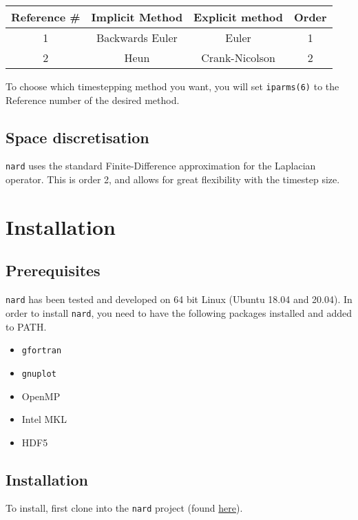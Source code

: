 \documentclass[11pt]{article}
\begin{document}
        {\centering\begin{table}[H]
             \begin{tabular}{c | c | c | c}
             Reference \# & Implicit Method & Explicit method & Order \\
             \hline
             1            & Backwards Euler & Euler           & 1     \\
             2            & Heun            & Crank-Nicolson  & 2
    \end{tabular}\label{tab:table1}
    \end{table}}

    To choose which timestepping method you want, you will set \texttt{iparms(6)} to the Reference number of the desired method.

    \subsection{Space discretisation}
    \texttt{nard} uses the standard Finite-Difference approximation for the Laplacian operator. This is order 2, and allows for great flexibility with the timestep size.

    \section[Installation]{Installation}
    \subsection[Prerequisites]{Prerequisites}
    \texttt{nard} has been tested and developed on 64 bit Linux (Ubuntu 18.04 and 20.04). In order to install \texttt{nard}, you need to have the following packages installed and added to PATH.
    \begin{itemize}
        \item \texttt{gfortran}
        \item \texttt{gnuplot}
        \item OpenMP
        \item Intel MKL
        \item HDF5
    \end{itemize}

    \subsection[Installation]{Installation}
    To install, first clone into the \texttt{nard} project (found \href{https://github.com/JacobVandenberg/nard}{here}).
\end{document}
